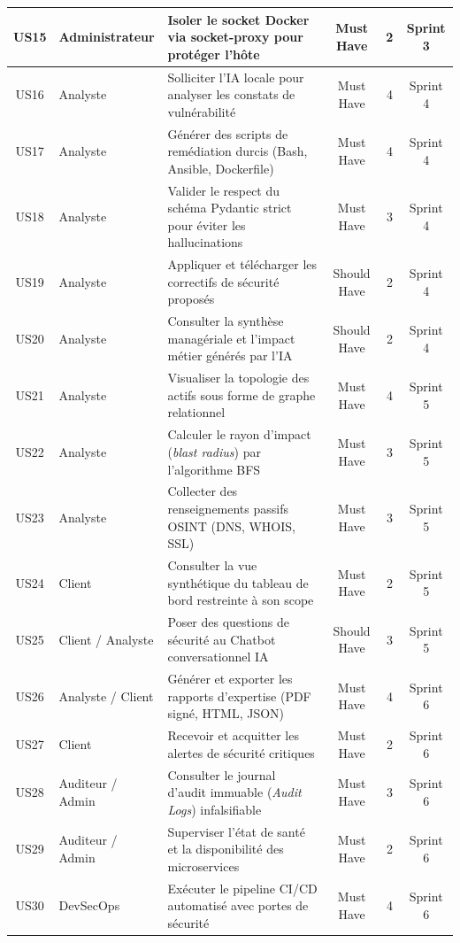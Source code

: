 \begin{table}[H]
{\begin{tabular}{|c|L|L|c|c|c|}
\hline
US15 & Administrateur & Isoler le socket Docker via socket-proxy pour prot\'eger l'h\^ote & Must Have & 2 & Sprint 3 \\
\hline
US16 & Analyste & Solliciter l'IA locale pour analyser les constats de vuln\'erabilit\'e & Must Have & 4 & Sprint 4 \\
\hline
US17 & Analyste & G\'en\'erer des scripts de rem\'ediation durcis (Bash, Ansible, Dockerfile) & Must Have & 4 & Sprint 4 \\
\hline
US18 & Analyste & Valider le respect du sch\'ema Pydantic strict pour \'eviter les hallucinations & Must Have & 3 & Sprint 4 \\
\hline
US19 & Analyste & Appliquer et t\'el\'echarger les correctifs de s\'ecurit\'e propos\'es & Should Have & 2 & Sprint 4 \\
\hline
US20 & Analyste & Consulter la synth\`ese manag\'eriale et l'impact m\'etier g\'en\'er\'es par l'IA & Should Have & 2 & Sprint 4 \\
\hline
US21 & Analyste & Visualiser la topologie des actifs sous forme de graphe relationnel & Must Have & 4 & Sprint 5 \\
\hline
US22 & Analyste & Calculer le rayon d'impact (\textit{blast radius}) par l'algorithme BFS & Must Have & 3 & Sprint 5 \\
\hline
US23 & Analyste & Collecter des renseignements passifs OSINT (DNS, WHOIS, SSL) & Must Have & 3 & Sprint 5 \\
\hline
US24 & Client & Consulter la vue synth\'etique du tableau de bord restreinte \`a son scope & Must Have & 2 & Sprint 5 \\
\hline
US25 & Client / Analyste & Poser des questions de s\'ecurit\'e au Chatbot conversationnel IA & Should Have & 3 & Sprint 5 \\
\hline
US26 & Analyste / Client & G\'en\'erer et exporter les rapports d'expertise (PDF sign\'e, HTML, JSON) & Must Have & 4 & Sprint 6 \\
\hline
US27 & Client & Recevoir et acquitter les alertes de s\'ecurit\'e critiques & Must Have & 2 & Sprint 6 \\
\hline
US28 & Auditeur / Admin & Consulter le journal d'audit immuable (\textit{Audit Logs}) infalsifiable & Must Have & 3 & Sprint 6 \\
\hline
US29 & Auditeur / Admin & Superviser l'\'etat de sant\'e et la disponibilit\'e des microservices & Must Have & 2 & Sprint 6 \\
\hline
US30 & DevSecOps & Ex\'ecuter le pipeline CI/CD automatis\'e avec portes de s\'ecurit\'e & Must Have & 4 & Sprint 6 \\
\hline
\end{tabular}}%
\end{table}

